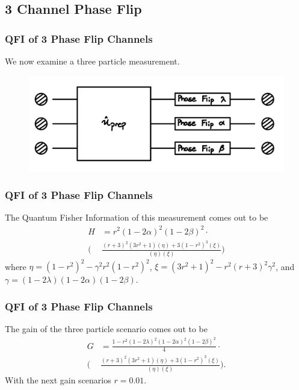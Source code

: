 \documentclass{beamer}
\begin{document}
\subsection{\tiny{3 Channel Phase Flip}}
\begin{frame}
\frametitle{QFI of 3 Phase Flip Channels}
We now examine a three particle measurement.
\begin{figure}
\begin{center}
\includegraphics[width=0.75\linewidth]{Phase-Flip-Triple-Channel-Lambda-Schematic.jpg}
\end{center}
\end{figure}
\end{frame}
\begin{frame}
\frametitle{QFI of 3 Phase Flip Channels}
The Quantum Fisher Information of this measurement comes out to be
\begin{align}\label{eq:45}
H&=r^2(1-2\alpha)^2(1-2\beta)^2\cdot \nonumber \\
\bigg(&\frac{(r+3)^2(3r^2+1)(\eta)+3(1-r^2)^3(\xi)}{(\eta)(\xi)}\bigg)
\end{align}
where $\eta=(1-r^2)^2-\gamma^2r^2(1-r^2)^2$, $\xi=(3r^2+1)^2-r^2(r+3)^2\gamma^2$, and $\gamma=(1-2\lambda)(1-2\alpha)(1-2\beta)$. 
\end{frame}
\begin{frame}
\frametitle{QFI of 3 Phase Flip Channels}
The gain of the three particle scenario comes out to be
\begin{align}\label{eq:46}
G&=\frac{1-r^2(1-2\lambda)^2(1-2\alpha)^2(1-2\beta)^2}{4}\cdot \nonumber \\
\bigg(&\frac{(r+3)^2(3r^2+1)(\eta)+3(1-r^2)^3(\xi)}{(\eta)(\xi)}\bigg).
\end{align}
With the next gain scenarios $r=0.01$.
\end{frame}
\end{document}
